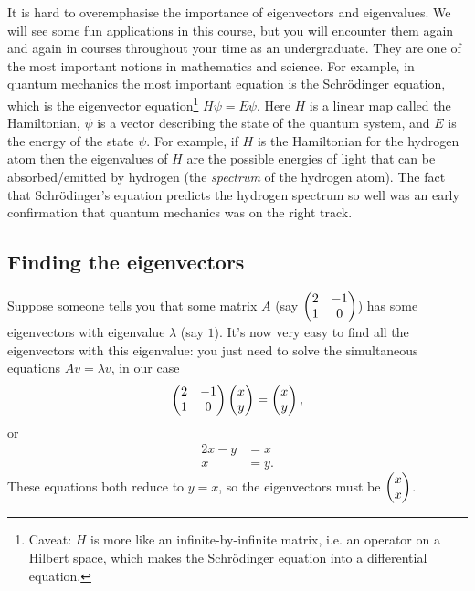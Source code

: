 \documentclass{article}
\begin{document}
\begin{Remark}
It is hard to overemphasise the importance of eigenvectors and
eigenvalues. We will see some fun applications in this course, but
you will encounter them again and again in courses throughout your
time as an undergraduate. They are one of the most important notions
in mathematics and science. For example, in quantum mechanics the
most important equation is the Schr\"{o}dinger equation, which is
the eigenvector equation\footnote{Caveat: \(H\) is more like an
infinite-by-infinite matrix, i.e. an operator on a Hilbert space,
which makes the Schr\"{o}dinger equation into a differential
equation.} \(H\psi=E\psi\). Here \(H\) is a linear map called the
Hamiltonian, \(\psi\) is a vector describing the state of the
quantum system, and \(E\) is the energy of the state \(\psi\). For
example, if \(H\) is the Hamiltonian for the hydrogen atom then the
eigenvalues of \(H\) are the possible energies of light that can be
absorbed/emitted by hydrogen (the {\em spectrum} of the hydrogen
atom). The fact that Schr\"{o}dinger's equation predicts the
hydrogen spectrum so well was an early confirmation that quantum
mechanics was on the right track.


\end{Remark}
\subsection{Finding the eigenvectors}


Suppose someone tells you that some matrix \(A\) (say \(\begin{pmatrix} 2 & -1
\\ 1 & 0 \end{pmatrix}\)) has some eigenvectors with eigenvalue \(\lambda\) (say
\(1\)). It's now very easy to find all the eigenvectors with this
eigenvalue: you just need to solve the simultaneous equations
\(Av=\lambda v\), in our case
\[\begin{pmatrix} 2 & -1 \\ 1 & 0 \end{pmatrix}\begin{pmatrix} x \\ y \end{pmatrix}=\begin{pmatrix} x \\ y\end{pmatrix},\]
or
\begin{align*}
2x-y&=x\\
x&=y.
\end{align*}
These equations both reduce to \(y=x\), so the eigenvectors must be
\(\begin{pmatrix} x \\ x \end{pmatrix}\).
\end{document}

